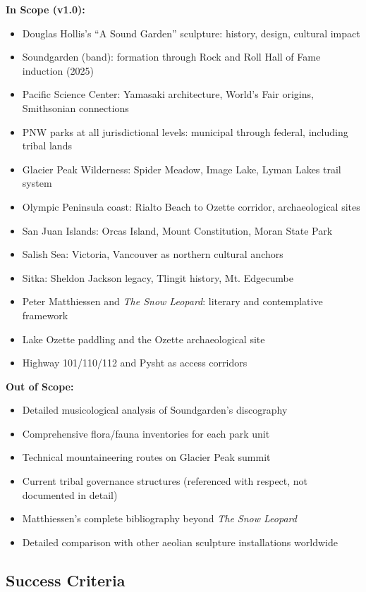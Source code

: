 \documentclass[11pt,letterpaper]{article}
\begin{document}
\textbf{In Scope (v1.0):}
\begin{itemize}[leftmargin=2em]
\item Douglas Hollis's ``A Sound Garden'' sculpture: history, design, cultural impact
\item Soundgarden (band): formation through Rock and Roll Hall of Fame induction (2025)
\item Pacific Science Center: Yamasaki architecture, World's Fair origins, Smithsonian connections
\item PNW parks at all jurisdictional levels: municipal through federal, including tribal lands
\item Glacier Peak Wilderness: Spider Meadow, Image Lake, Lyman Lakes trail system
\item Olympic Peninsula coast: Rialto Beach to Ozette corridor, archaeological sites
\item San Juan Islands: Orcas Island, Mount Constitution, Moran State Park
\item Salish Sea: Victoria, Vancouver as northern cultural anchors
\item Sitka: Sheldon Jackson legacy, Tlingit history, Mt. Edgecumbe
\item Peter Matthiessen and \textit{The Snow Leopard}: literary and contemplative framework
\item Lake Ozette paddling and the Ozette archaeological site
\item Highway 101/110/112 and Pysht as access corridors
\end{itemize}

\textbf{Out of Scope:}
\begin{itemize}[leftmargin=2em]
\item Detailed musicological analysis of Soundgarden's discography
\item Comprehensive flora/fauna inventories for each park unit
\item Technical mountaineering routes on Glacier Peak summit
\item Current tribal governance structures (referenced with respect, not documented in detail)
\item Matthiessen's complete bibliography beyond \textit{The Snow Leopard}
\item Detailed comparison with other aeolian sculpture installations worldwide
\end{itemize}

\subsection{Success Criteria}
\end{document}
